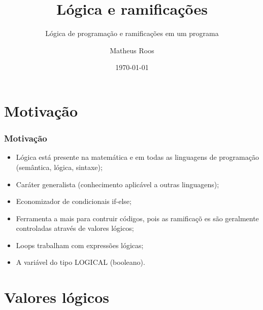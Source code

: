 \documentclass[xcolor=table]{beamer}
\begin{document}
\title[Ramificações]{Lógica e ramificações}
\subtitle{Lógica de programação e ramificações em um programa}
\author[Roos]{Matheus Roos}
\date{\today}
\maketitle

\section{Motiva\c{c}\~{a}o}

\begin{frame}%

\frametitle{Motiva\c{c}\~{a}o}

\begin{itemize}
\item L\'{o}gica est\'{a} presente na matem\'{a}tica e em todas as
linguagens de programa\c{c}\~{a}o (sem\^{a}ntica, l\'{o}gica, sintaxe);

\item Car\'{a}ter generalista (conhecimento aplic\'{a}vel a outras
linguagens);

\item Economizador de condicionais if-else;

\item Ferramenta a mais para contruir c\'{o}digos, pois as ramifica\c{c}\~{o}%
es s\~{a}o geralmente controladas atrav\'{e}s de valores l\'{o}gicos;

\item Loops trabalham com express\~{o}es l\'{o}gicas;

\item A vari\'{a}vel do tipo LOGICAL (booleano).
\end{itemize}

\transboxout%
\end{frame}%

\section{Valores l\'{o}gicos}
\end{document}
